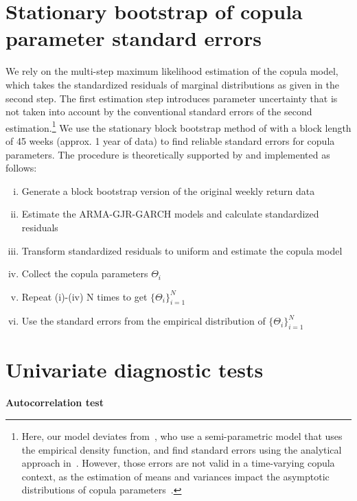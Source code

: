 \section{Stationary bootstrap of copula parameter standard errors} \label{App:Appendix_bootstrap}
We rely on the multi-step maximum likelihood estimation of the copula model, which takes the standardized residuals of marginal distributions as given in the second step. The first estimation step introduces parameter uncertainty that is not taken into account by the conventional standard errors of the second estimation.\footnote{Here, our model deviates from~\textcite{ChristoffersenLanglois2013}, who use a semi-parametric model that uses the empirical density function, and find standard errors using the analytical approach in~\textcite{ChenFan2006}. However, those errors are not valid in a time-varying copula context, as the estimation of means and variances impact the asymptotic distributions of copula parameters~\autocite{Remillard2010}.} We use the stationary block bootstrap method of \textcite{PolitisRomano1994} with a block length of 45 weeks (approx. 1 year of data) to find reliable standard errors for copula parameters. The procedure is theoretically supported by \textcite{GonclavesWhite2004} and implemented as follows:
\begin{enumerate}[(i)]
    \item Generate a block bootstrap version of the original weekly return data
    \item Estimate the ARMA-GJR-GARCH models and calculate standardized residuals
    \item Transform standardized residuals to uniform and estimate the copula model
    \item Collect the copula parameters $\Theta_i$
    \item Repeat (i)-(iv) N times to get $\{\Theta_i\}^{N}_{i=1}$
    \item Use the standard errors from the empirical distribution of $\{\Theta_i\}^{N}_{i=1}$
\end{enumerate}

\newpage

\section{Univariate diagnostic tests}
\label{app:univariate_diagnostics}

\textbf{Autocorrelation test}

